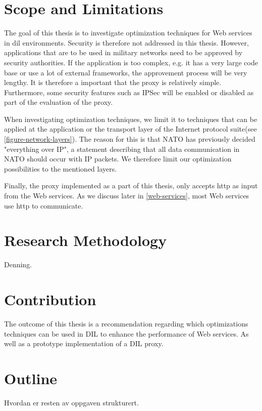 \section{Scope and Limitations}

The goal of this thesis is to investigate optimization techniques for Web
services in \gls{dil} environments. Security is therefore not addressed in this
thesis. However, applications that are to be used in military networks need to
be approved by security authorities. If the application is too complex, e.g. it
has a very large code base or use a lot of external frameworks, the approvement
process will be very lengthy. It is therefore a important that the proxy is
relatively simple. Furthermore, some security features such as IPSec will be
enabled or disabled as part of the evaluation of the proxy.

When investigating optimization techniques, we limit it to techniques that can
be applied at the application or the transport layer of the Internet protocol
suite(see \cref{figure-network-layers}). The reason for this is that NATO has
previously decided "everything over IP", a statement describing that all data
communication in NATO should occur with IP packets. We therefore limit our
optimization possibilities to the mentioned layers.

Finally, the proxy implemented as a part of this thesis, only accepts \gls{http} as
input from the Web services. As we discuss later in \cref{web-services}, most
Web services use \gls{http} to communicate.


\section{Research Methodology}
Denning.


\section{Contribution}

The outcome of this thesis is a recommendation regarding which optimizations
techniques can be used in DIL to enhance the performance of Web services. As
well as a prototype implementation of a DIL proxy.

\section{Outline}
Hvordan er resten av oppgaven strukturert.
